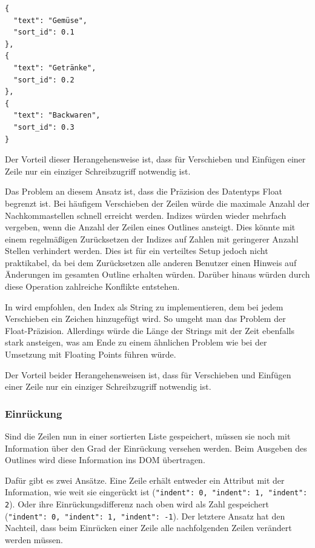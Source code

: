 \medskip
\begin{lstlisting}[caption=Drei Zeilen mit Float-Index, label={lst:floatsortOutlineLines}]
{
  "text": "Gemüse",
  "sort_id": 0.1
},
{
  "text": "Getränke",
  "sort_id": 0.2
},
{
  "text": "Backwaren",
  "sort_id": 0.3
}
\end{lstlisting}

Der Vorteil dieser Herangehensweise ist, dass für Verschieben und Einfügen einer Zeile nur ein einziger Schreibzugriff notwendig ist.

Das Problem an diesem Ansatz ist, dass die Präzision des Datentyps Float begrenzt ist. Bei häufigem Verschieben der Zeilen würde die maximale Anzahl der Nachkommastellen schnell erreicht werden. Indizes würden wieder mehrfach vergeben, wenn die Anzahl der Zeilen eines Outlines ansteigt. Dies könnte mit einem regelmäßigen Zurücksetzen der Indizes auf Zahlen mit geringerer Anzahl Stellen verhindert werden. Dies ist für ein verteiltes Setup jedoch nicht praktikabel, da bei dem Zurücksetzen alle anderen Benutzer einen Hinweis auf Änderungen im gesamten Outline erhalten würden. Darüber hinaus würden durch diese Operation zahlreiche Konflikte entstehen.

In \cite{design:replication} wird empfohlen, den Index als String zu implementieren, dem bei jedem Verschieben ein Zeichen hinzugefügt wird. So umgeht man das Problem der Float-Präzision. Allerdings würde die Länge der Strings mit der Zeit ebenfalls stark ansteigen, was am Ende zu einem ähnlichen Problem wie bei der Umsetzung mit Floating Points führen würde.

Der Vorteil beider Herangehensweisen ist, dass für Verschieben und Einfügen einer Zeile nur ein einziger Schreibzugriff notwendig ist.

\subsubsection{Einrückung}
\label{subsec:einrueckung}

Sind die Zeilen nun in einer sortierten Liste gespeichert, müssen sie noch mit Information über den Grad der Einrückung versehen werden. Beim Ausgeben des Outlines wird diese Information ins DOM übertragen. 

Dafür gibt es zwei Ansätze. Eine Zeile erhält entweder ein Attribut mit der Information, wie weit sie eingerückt ist (\lstinline!"indent": 0, "indent": 1, "indent": 2!). Oder ihre Einrückungsdifferenz nach oben wird als Zahl gespeichert (\lstinline!"indent": 0, "indent": 1, "indent": -1!). Der letztere Ansatz hat den Nachteil, dass beim Einrücken einer Zeile alle nachfolgenden Zeilen verändert werden müssen.

